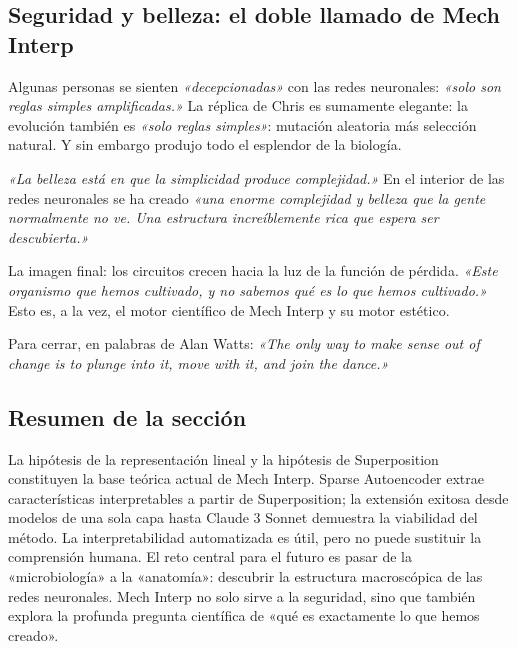 \subsection{Seguridad y belleza: el doble llamado de Mech Interp}

Algunas personas se sienten \textit{«decepcionadas»} con las redes neuronales: \textit{«solo son reglas simples amplificadas.»} La réplica de Chris es sumamente elegante: la evolución también es \textit{«solo reglas simples»}: mutación aleatoria más selección natural. Y sin embargo produjo todo el esplendor de la biología.

\textit{«La belleza está en que la simplicidad produce complejidad.»} En el interior de las redes neuronales se ha creado \textit{«una enorme complejidad y belleza que la gente normalmente no ve. Una estructura increíblemente rica que espera ser descubierta.»}

La imagen final: los circuitos crecen hacia la luz de la función de pérdida. \textit{«Este organismo que hemos cultivado, y no sabemos qué es lo que hemos cultivado.»} Esto es, a la vez, el motor científico de Mech Interp y su motor estético.

Para cerrar, en palabras de Alan Watts: \textit{«The only way to make sense out of change is to plunge into it, move with it, and join the dance.»}

\subsection{Resumen de la sección}

La hipótesis de la representación lineal y la hipótesis de Superposition constituyen la base teórica actual de Mech Interp. Sparse Autoencoder extrae características interpretables a partir de Superposition; la extensión exitosa desde modelos de una sola capa hasta Claude 3 Sonnet demuestra la viabilidad del método. La interpretabilidad automatizada es útil, pero no puede sustituir la comprensión humana. El reto central para el futuro es pasar de la «microbiología» a la «anatomía»: descubrir la estructura macroscópica de las redes neuronales. Mech Interp no solo sirve a la seguridad, sino que también explora la profunda pregunta científica de «qué es exactamente lo que hemos creado».

